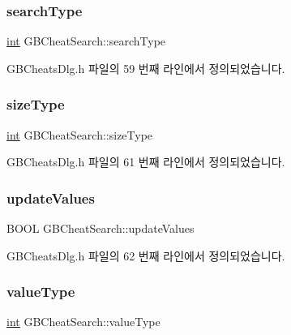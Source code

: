 \subsubsection{\texorpdfstring{search\+Type}{searchType}}
{\footnotesize\ttfamily \mbox{\hyperlink{_util_8cpp_a0ef32aa8672df19503a49fab2d0c8071}{int}} G\+B\+Cheat\+Search\+::search\+Type}



G\+B\+Cheats\+Dlg.\+h 파일의 59 번째 라인에서 정의되었습니다.

\mbox{\label{class_g_b_cheat_search_ad6db93445aa94c36d4d5275204e7ecb0}} 
\subsubsection{\texorpdfstring{size\+Type}{sizeType}}
{\footnotesize\ttfamily \mbox{\hyperlink{_util_8cpp_a0ef32aa8672df19503a49fab2d0c8071}{int}} G\+B\+Cheat\+Search\+::size\+Type}



G\+B\+Cheats\+Dlg.\+h 파일의 61 번째 라인에서 정의되었습니다.

\mbox{\label{class_g_b_cheat_search_aa300097df0223fda71edea99324e9cb6}} 
\subsubsection{\texorpdfstring{update\+Values}{updateValues}}
{\footnotesize\ttfamily B\+O\+OL G\+B\+Cheat\+Search\+::update\+Values}



G\+B\+Cheats\+Dlg.\+h 파일의 62 번째 라인에서 정의되었습니다.

\mbox{\label{class_g_b_cheat_search_a86a4834163ee6a13a5bb8531a7c67c1d}} 
\subsubsection{\texorpdfstring{value\+Type}{valueType}}
{\footnotesize\ttfamily \mbox{\hyperlink{_util_8cpp_a0ef32aa8672df19503a49fab2d0c8071}{int}} G\+B\+Cheat\+Search\+::value\+Type}



